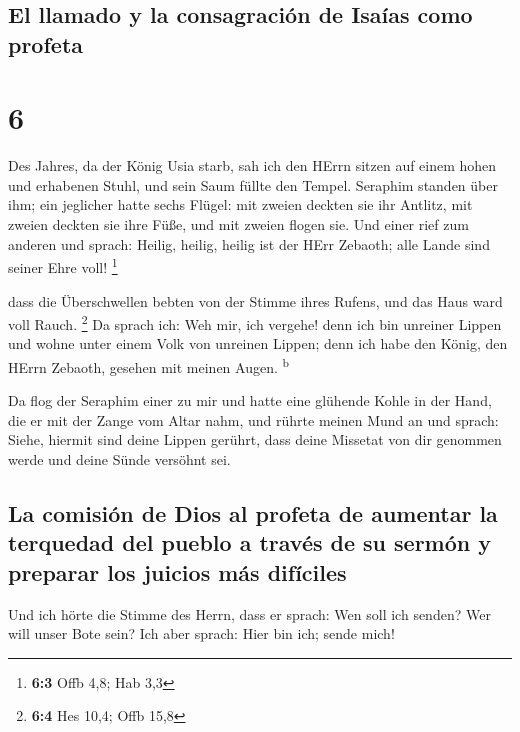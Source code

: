 \hypertarget{el-llamado-y-la-consagraciuxf3n-de-isauxedas-como-profeta}{%
\subsection{El llamado y la consagración de Isaías como
profeta}\label{el-llamado-y-la-consagraciuxf3n-de-isauxedas-como-profeta}}

\hypertarget{section-5}{%
\section{6}\label{section-5}}

 Des Jahres, da der König Usia starb, sah ich den HErrn
sitzen auf einem hohen und erhabenen Stuhl, und sein Saum füllte den
Tempel.  Seraphim standen über ihm; ein jeglicher hatte
sechs Flügel: mit zweien deckten sie ihr Antlitz, mit zweien deckten sie
ihre Füße, und mit zweien flogen sie.  Und einer rief zum
anderen und sprach: Heilig, heilig, heilig ist der HErr Zebaoth; alle
Lande sind seiner Ehre voll! \footnote{\textbf{6:3} Offb 4,8; Hab 3,3}

 dass die Überschwellen bebten von der Stimme ihres
Rufens, und das Haus ward voll Rauch. \footnote{\textbf{6:4} Hes 10,4;
  Offb 15,8}  Da sprach ich: Weh mir, ich vergehe! denn
ich bin unreiner Lippen und wohne unter einem Volk von unreinen Lippen;
denn ich habe den König, den HErrn Zebaoth, gesehen mit meinen Augen.
\textsuperscript{b}

 Da flog der Seraphim einer zu mir und hatte eine glühende
Kohle in der Hand, die er mit der Zange vom Altar nahm, 
und rührte meinen Mund an und sprach: Siehe, hiermit sind deine Lippen
gerührt, dass deine Missetat von dir genommen werde und deine Sünde
versöhnt sei.

\hypertarget{la-comisiuxf3n-de-dios-al-profeta-de-aumentar-la-terquedad-del-pueblo-a-travuxe9s-de-su-sermuxf3n-y-preparar-los-juicios-muxe1s-difuxedciles}{%
\subsection{La comisión de Dios al profeta de aumentar la terquedad del
pueblo a través de su sermón y preparar los juicios más
difíciles}\label{la-comisiuxf3n-de-dios-al-profeta-de-aumentar-la-terquedad-del-pueblo-a-travuxe9s-de-su-sermuxf3n-y-preparar-los-juicios-muxe1s-difuxedciles}}

 Und ich hörte die Stimme des Herrn, dass er sprach: Wen
soll ich senden? Wer will unser Bote sein? Ich aber sprach: Hier bin
ich; sende mich!

